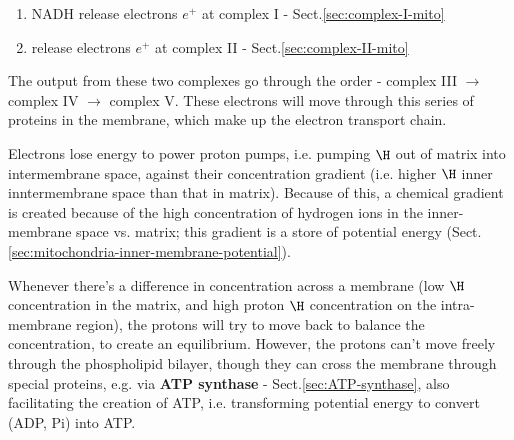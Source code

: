 \begin{enumerate}
  \item NADH release electrons $e^+$ at complex I   -
  Sect.\ref{sec:complex-I-mito}

  \item {} release electrons $e^+$ at  complex II -
  Sect.\ref{sec:complex-II-mito}
\end{enumerate}
The output from these two complexes go through the order - complex III
$\rightarrow$ complex IV $\rightarrow$ complex V. These electrons will move
through this series of proteins in the membrane, which make up the electron transport chain.

\begin{mdframed}
Electrons lose energy to power proton pumps, i.e. pumping $\H$ out of matrix
into intermembrane space, against their concentration gradient (i.e. higher $\H$
inner inntermembrane space than that in matrix).
Because of this, a chemical gradient is created because of the high
concentration of hydrogen ions in the inner-membrane space vs. matrix; this
gradient is a store of potential energy
(Sect.\ref{sec:mitochondria-inner-membrane-potential}).

\end{mdframed}

Whenever there's a difference in concentration across a membrane (low $\H$
concentration in the matrix, and high proton $\H$ concentration on the
intra-membrane region), the protons will try to move back to balance the
concentration, to create an equilibrium.
However, the protons can't move freely through the phospholipid bilayer, though
they can cross the membrane through special proteins, e.g. via {\bf ATP
synthase} - Sect.\ref{sec:ATP-synthase}, also facilitating the
creation of ATP, i.e. transforming potential energy to convert (ADP, Pi) into
ATP.








